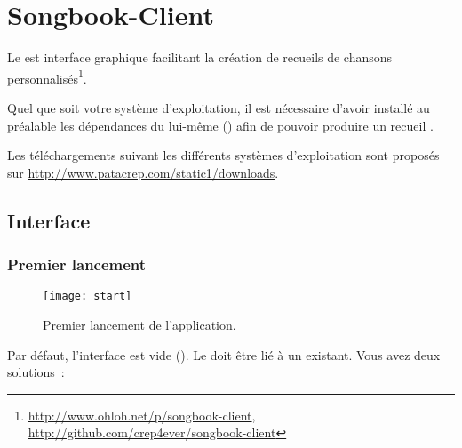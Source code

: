 \chapter{Songbook-Client}
\setcounter{chapter}{2}
\label{chap:songbook-client}
\minitoc

Le \client{} est interface graphique facilitant la création de
recueils de chansons
personnalisés\footnote{\url{http://www.ohloh.net/p/songbook-client},
  \url{http://github.com/crep4ever/songbook-client}}.

\begin{nota}
Quel que soit votre système d'exploitation, il est nécessaire d'avoir
installé au préalable les dépendances du \recueil{} lui-même
() afin de pouvoir produire un recueil .
\end{nota}

Les téléchargements suivant les différents systèmes d'exploitation
sont proposés sur \url{http://www.patacrep.com/static1/downloads}.


\section{Interface}

\subsection{Premier lancement}

\begin{figure}
  \centering
  \texttt{[image: start]}
  \caption{Premier lancement de l'application.}
  \label{fig:start}
\end{figure}

Par défaut, l'interface est vide (). Le
\client{} doit être lié à un \recueil{} existant. Vous avez
deux solutions~:

